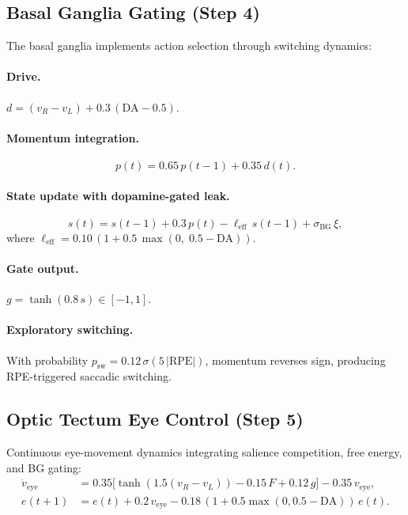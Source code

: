 \documentclass[11pt,a4paper]{article}
\begin{document}
\subsection{Basal Ganglia Gating (Step 4)}

The basal ganglia implements action selection through switching dynamics:

\paragraph{Drive.}
$d = (v_R - v_L) + 0.3\,(\text{DA} - 0.5)$.

\paragraph{Momentum integration.}
\begin{equation}\label{eq:bg_momentum}
  p(t) = 0.65\,p(t{-}1) + 0.35\,d(t).
\end{equation}

\paragraph{State update with dopamine-gated leak.}
\begin{equation}\label{eq:bg_state}
  s(t) = s(t{-}1) + 0.3\,p(t)
    - \ell_\text{eff}\,s(t{-}1) + \sigma_\text{BG}\,\xi,
\end{equation}
where $\ell_\text{eff} = 0.10\,(1 + 0.5\,\max(0,\; 0.5 - \text{DA}))$.

\paragraph{Gate output.}
$g = \tanh(0.8\,s) \in [-1, 1]$.

\paragraph{Exploratory switching.}
With probability $p_\text{sw} = 0.12\,\sigma(5\,|\text{RPE}|)$, momentum
reverses sign, producing RPE-triggered saccadic switching.

\subsection{Optic Tectum Eye Control (Step 5)}

Continuous eye-movement dynamics integrating salience competition, free energy,
and BG gating:
\begin{equation}\label{eq:ot_eye}
\begin{aligned}
  \dot{v}_\text{eye} &= 0.35\bigl[\tanh(1.5(v_R{-}v_L)) - 0.15\,F + 0.12\,g\bigr]
                       - 0.35\,v_\text{eye}, \\
  e(t{+}1) &= e(t) + 0.2\,v_\text{eye}
              - 0.18\,(1{+}0.5\max(0, 0.5{-}\text{DA}))\,e(t).
\end{aligned}
\end{equation}
\end{document}

